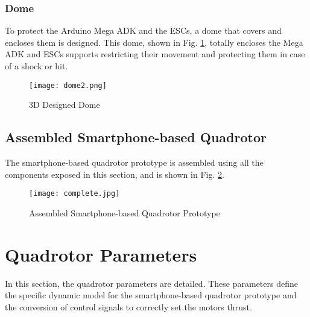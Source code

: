 \subsubsection{Dome}
To protect the Arduino Mega ADK and the ESCs, a dome that covers and encloses them is designed. This dome, shown in Fig. \ref{fig:dome}, totally encloses the Mega ADK and ESCs supports restricting their movement and protecting them in case of a shock or hit.
\begin{figure}[H]
	\begin{center}
		\texttt{[image: dome2.png]}    
		\caption{3D Designed Dome} 
		\label{fig:dome}
	\end{center}
\end{figure}

\subsection{Assembled Smartphone-based Quadrotor}
The smartphone-based quadrotor prototype is assembled using all the components exposed in this section, and is shown in Fig. \ref{fig:completequad}.
\begin{figure}[H]
	\begin{center}
		\texttt{[image: complete.jpg]}    
		\caption{Assembled Smartphone-based Quadrotor Prototype} 
		\label{fig:completequad}
	\end{center}
\end{figure}

\section{Quadrotor Parameters} \label{sec:parameters}
In this section, the quadrotor parameters are detailed. These parameters define the specific dynamic model for the smartphone-based quadrotor prototype and the conversion of control signals to correctly set the motors thrust.
